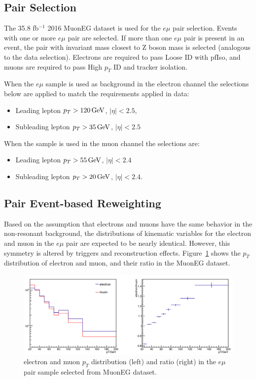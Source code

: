 \subsection{ Pair Selection}
The 35.8 fb$^{-1}$ 2016 MuonEG dataset is used for the $e\mu$ pair selection.  Events with one or more $e\mu$ pair are selected. If more than one $e\mu$ pair is present in an event, the pair with invariant mass closest to Z boson mass is selected (analogous to the data selection). Electrons are required to pass Loose ID with pfIso, and muons are required to pass High $p_T$ ID and tracker isolation. 

\vspace{0.3cm}
When the $e\mu$ sample is used as background in the electron channel the selections below are applied to match the requirements applied in data: 
\begin{itemize}
\item Leading lepton $p_{T}>120\,\text{Ge\hspace{-.08em}V}$, $|\eta|<2.5$, 
\item Subleading lepton $p_{T}>35\,\text{Ge\hspace{-.08em}V}$, $|\eta|<2.5$
\end{itemize}
When the sample is used in the muon channel the selections are:
\begin{itemize}
\item Leading lepton $p_{T}>55\,\text{Ge\hspace{-.08em}V}$, $|\eta|<2.4$
\item Subleading lepton $p_{T}>20\,\text{Ge\hspace{-.08em}V}$, $|\eta|<2.4$. 
\end{itemize}

\subsection{ Pair Event-based Reweighting}
Based on the assumption that electrons and muons have the same behavior in the non-resonant background, the distributions of kinematic variables for the electron and muon in the $e\mu$ pair are expected to be nearly identical. However, this symmetry is altered by triggers and reconstruction effects. Figure~\ref{fig:nonresmuelpt} shows the $p_T$ distribution of electron and muon, and their ratio in the MuonEG dataset.

\begin{figure}[htbp]
\begin{center}
\includegraphics[width=0.95\linewidth]{figures/nonresmuelpt.png}
\caption{electron and muon $p_T$ distribution (left) and ratio (right) in the $e\mu$ pair sample selected from MuonEG dataset.}
\label{fig:nonresmuelpt}
\end{center}
\end{figure}

